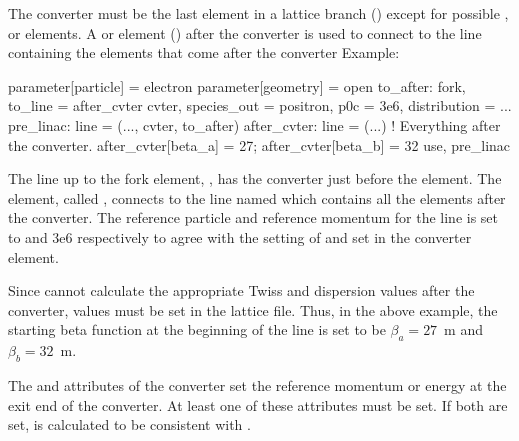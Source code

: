 The converter must be the last element in a lattice branch () except for possible
,  or  elements. A  or  element
() after the converter is used to connect to the line containing the elements that come
after the converter Example:
\begin{example}
  parameter[particle] = electron
  parameter[geometry] = open
  to_after: fork, to_line = after_cvter
  cvter, species_out = positron, p0c = 3e6, distribution = ...
  pre_linac: line = (..., cvter, to_after)
  after_cvter: line = (...)                ! Everything after the converter.
  after_cvter[beta_a] = 27; after_cvter[beta_b] = 32
  use, pre_linac
\end{example}
The line up to the fork element, , has the converter just before the 
element. The  element, called , connects to the line named 
which contains all the elements after the converter. The reference particle and reference momentum
for the  line is set to  and 3e6 respectively to agree with the setting
of  and  set in the converter element.

Since \bmad cannot calculate the appropriate Twiss and dispersion values after the converter, values
must be set in the lattice file.  Thus, in the above example, the starting beta function at the
beginning of the  line is set to be $\beta_a = 27$~m and $\beta_b = 32$~m.

The  and  attributes of the converter set the reference momentum or energy at the
exit end of the converter. At least one of these attributes must be set. If both are set, 
is calculated to be consistent with .

